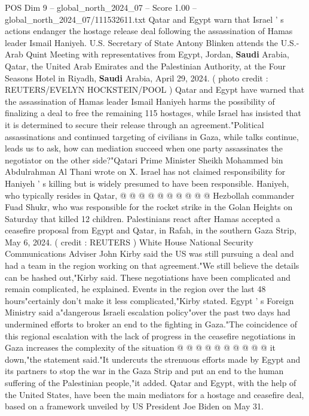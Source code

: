 \begin{textsample}{POS Dim 9 – global\_north\_2024\_07 – Score 1.00 – global\_north\_2024\_07/111532611.txt}  \label{ex:f9_pos_286}
Qatar and Egypt warn that Israel ' s actions endanger the hostage release deal following the assassination of Hamas leader Ismail Haniyeh.
U.S.
Secretary of State Antony Blinken attends the U.S.-Arab Quint Meeting with representatives from Egypt, Jordan, \textbf{Saudi} Arabia, Qatar, the United Arab Emirates and the Palestinian Authority, at the Four Seasons Hotel in Riyadh, \textbf{Saudi} Arabia, April 29, 2024. ( photo credit : REUTERS/EVELYN HOCKSTEIN/POOL ) Qatar and Egypt have warned that the assassination of Hamas leader Ismail Haniyeh harms the possibility of finalizing a deal to free the remaining 115 hostages, while Israel has insisted that it is determined to secure their release through an agreement."Political assassinations and continued targeting of civilians in Gaza, while talks continue, leads us to ask, how can mediation succeed when one party assassinates the negotiator on the other side?"Qatari Prime Minister Sheikh Mohammed bin Abdulrahman Al Thani wrote on X.
Israel has not claimed responsibility for Haniyeh ' s killing but is widely presumed to have been responsible.
Haniyeh, who typically resides in Qatar, @ @ @ @ @ @ @ @ @ @ Hezbollah commander Fuad Shukr, who was responsible for the rocket strike in the Golan Heights on Saturday that killed 12 children.
Palestinians react after Hamas accepted a ceasefire proposal from Egypt and Qatar, in Rafah, in the southern Gaza Strip, May 6, 2024. ( credit : REUTERS ) White House National Security Communications Adviser John Kirby said the US was still pursuing a deal and had a team in the region working on that agreement."We still believe the details can be hashed out,"Kirby said.
These negotiations have been complicated and remain complicated, he explained.
Events in the region over the last 48 hours"certainly don't make it less complicated,"Kirby stated.
Egypt ' s Foreign Ministry said a"dangerous Israeli escalation policy"over the past two days had undermined efforts to broker an end to the fighting in Gaza."The coincidence of this regional escalation with the lack of progress in the ceasefire negotiations in Gaza increases the complexity of the situation @ @ @ @ @ @ @ @ @ @ it down,"the statement said."It undercuts the strenuous efforts made by Egypt and its partners to stop the war in the Gaza Strip and put an end to the human suffering of the Palestinian people,"it added.
Qatar and Egypt, with the help of the United States, have been the main mediators for a hostage and ceasefire deal, based on a framework unveiled by US President Joe Biden on May 31.

\end{textsample}
